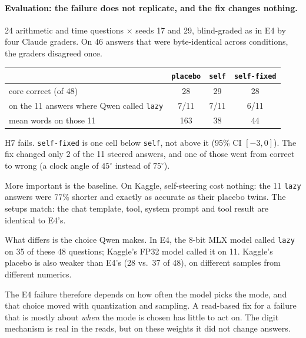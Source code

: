 \paragraph{Evaluation: the failure does not replicate, and the fix changes nothing.}
24 arithmetic and time questions $\times$ seeds 17 and 29, blind-graded as in E4 by four Claude graders. On 46 answers that were byte-identical across conditions, the graders disagreed once.

\begin{center}\small
\begin{tabular}{lccc}\toprule
& \texttt{placebo} & \texttt{self} & \texttt{self-fixed}\\\midrule
core correct (of 48) & 28 & 29 & 28\\
on the 11 answers where Qwen called \texttt{lazy} & 7/11 & 7/11 & 6/11\\
mean words on those 11 & 163 & 38 & 44\\\bottomrule
\end{tabular}
\end{center}

H7 fails. \texttt{self-fixed} is one cell below \texttt{self}, not above it (95\% CI $[-3,0]$). The fix changed only 2 of the 11 steered answers, and one of those went from correct to wrong (a clock angle of $45^\circ$ instead of $75^\circ$).

More important is the baseline. On Kaggle, self-steering cost nothing: the 11 \texttt{lazy} answers were 77\% shorter and exactly as accurate as their placebo twins. The setups match: the chat template, tool, system prompt and tool result are identical to E4's.

What differs is the choice Qwen makes. In E4, the 8-bit MLX model called \texttt{lazy} on 35 of these 48 questions; Kaggle's FP32 model called it on 11. Kaggle's placebo is also weaker than E4's (28 vs.\ 37 of 48), on different samples from different numerics.

The E4 failure therefore depends on how often the model picks the mode, and that choice moved with quantization and sampling. A read-based fix for a failure that is mostly about \emph{when} the mode is chosen has little to act on. The digit mechanism is real in the reads, but on these weights it did not change answers.
